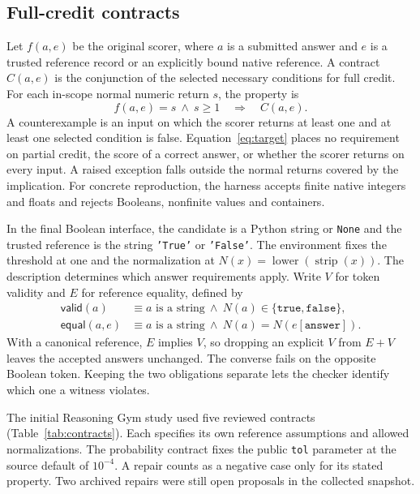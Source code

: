 \documentclass[sigconf]{acmart}
\newcommand{\Valid}{\mathsf{valid}}
\newcommand{\Equal}{\mathsf{equal}}
\begin{document}
\subsection{Full-credit contracts}

Let $f(a,e)$ be the original scorer, where $a$ is a submitted answer and $e$ is a trusted reference record or an explicitly bound native reference. A contract $C(a,e)$ is the conjunction of the selected necessary conditions for full credit. For each in-scope normal numeric return $s$, the property is
\begin{equation}
  f(a,e)=s\ \land\ s\geq 1\quad\Longrightarrow\quad C(a,e).
  \label{eq:target}
\end{equation}
A counterexample is an input on which the scorer returns at least one and at least one selected condition is false. Equation~\ref{eq:target} places no requirement on partial credit, the score of a correct answer, or whether the scorer returns on every input. A raised exception falls outside the normal returns covered by the implication. For concrete reproduction, the harness accepts finite native integers and floats and rejects Booleans, nonfinite values and containers.

In the final Boolean interface, the candidate is a Python string or \texttt{None} and the trusted reference is the string \texttt{'True'} or \texttt{'False'}. The environment fixes the threshold at one and the normalization at $N(x)=\operatorname{lower}(\operatorname{strip}(x))$. The description determines which answer requirements apply. Write $V$ for token validity and $E$ for reference equality, defined by
\begin{align}
 \Valid(a)&\equiv a\text{ is a string}\ \land\ N(a)\in\{\texttt{true},\texttt{false}\},\\
 \Equal(a,e)&\equiv a\text{ is a string}\ \land\ N(a)=N(e[\texttt{answer}]).
\end{align}
With a canonical reference, $E$ implies $V$, so dropping an explicit $V$ from $E+V$ leaves the accepted answers unchanged. The converse fails on the opposite Boolean token. Keeping the two obligations separate lets the checker identify which one a witness violates.

The initial Reasoning Gym study used five reviewed contracts (Table~\ref{tab:contracts}). Each specifies its own reference assumptions and allowed normalizations. The probability contract fixes the public \texttt{tol} parameter at the source default of $10^{-4}$. A repair counts as a negative case only for its stated property. Two archived repairs were still open proposals in the collected snapshot.
\end{document}
